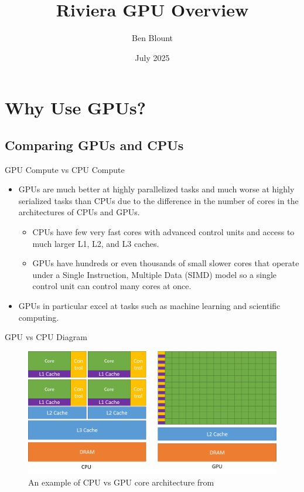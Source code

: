 \documentclass[aspectratio=169]{beamer}
\title{Riviera GPU Overview}
\author{Ben Blount}
\institute{Data Science Research Institute}
\date{July 2025}
\begin{document}
\maketitleframe

\section{Why Use GPUs?}

\subsection{Comparing GPUs and CPUs}
\begin{frame}{GPU Compute vs CPU Compute}
	\begin{itemize}
		\item GPUs are much better at highly parallelized tasks and much worse at highly serialized tasks than CPUs due to the difference in the number of cores in the architectures of CPUs and GPUs.
		      \begin{itemize}
			      \item CPUs have few very fast cores with advanced control units and access to much larger L1, L2, and L3 caches. \cite{gpuVsCpu}
			      \item GPUs have hundreds or even thousands of small slower cores that operate under a Single Instruction, Multiple Data (SIMD) model so a single control unit can control many cores at once. \cite{gpuVsCpu}
		      \end{itemize}
		\item GPUs in particular excel at tasks such as machine learning and scientific computing.
	\end{itemize}
\end{frame}

\begin{frame}{GPU vs CPU Diagram}
	\begin{figure}
		\centering
		\includegraphics[scale=.4]{figures/gpu-vs-cpu.png}
		\caption{An example of CPU vs GPU core architecture from \textcite{nivdiaCuda}}
	\end{figure}
\end{frame}
\end{document}
